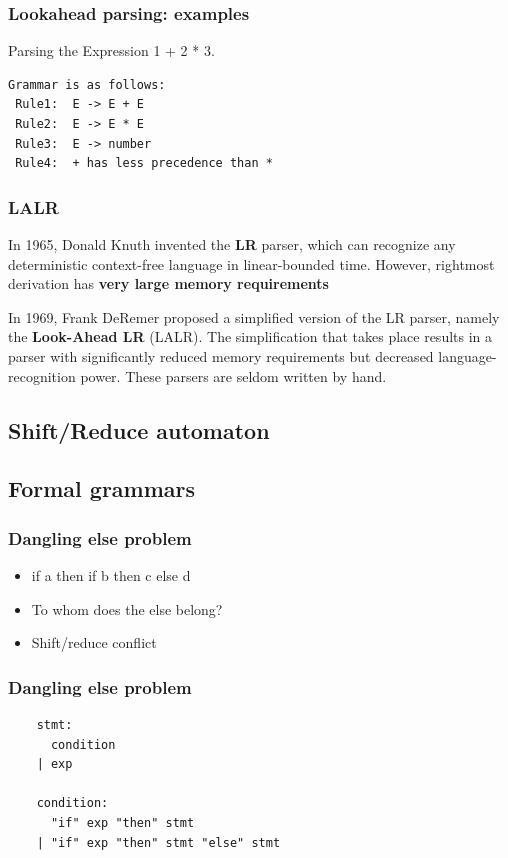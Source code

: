 \documentclass{beamer}
\begin{document}
\begin{frame}[fragile]
  \frametitle{Lookahead parsing: examples}
  Parsing the Expression 1 + 2 * 3.
  \vfill
\begin{verbatim}
Grammar is as follows:
 Rule1:  E -> E + E
 Rule2:  E -> E * E
 Rule3:  E -> number
 Rule4:  + has less precedence than *
\end{verbatim}
  \vfill
  \begin{center}
  \end{center}
\end{frame}

\begin{frame}
  \frametitle{LALR}
  In 1965, Donald Knuth invented the \textbf{LR} parser, which can recognize any
  deterministic context-free language in linear-bounded time. However, rightmost
  derivation has \textbf{very large memory requirements}

  \vfill

  In 1969, Frank DeRemer proposed a simplified version of the LR parser, namely
  the \textbf{Look-Ahead LR} (LALR). The simplification that takes place results
  in a parser with significantly reduced memory requirements but decreased
  language-recognition power. These parsers are seldom written by hand.
\end{frame}

\subsection{Shift/Reduce automaton}

\subsection{Formal grammars}


\begin{frame}
  \frametitle{Dangling else problem}
    \begin{itemize}[<+->]
      \item if a then if b then c else d
      \item To whom does the else belong?
      \item Shift/reduce conflict
    \end{itemize}
\end{frame}

\begin{frame}[fragile]
  \frametitle{Dangling else problem}
\begin{verbatim}
    stmt:
      condition
    | exp

    condition:
      "if" exp "then" stmt
    | "if" exp "then" stmt "else" stmt
\end{verbatim}
\end{frame}
\end{document}
